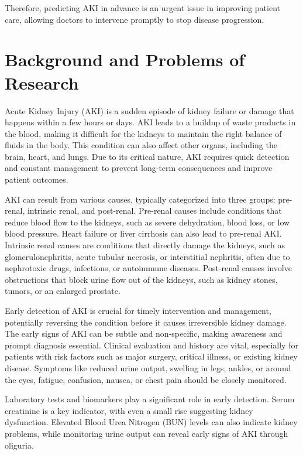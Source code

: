 \documentclass[../main.tex]{subfiles}
\begin{document}
Therefore, predicting AKI in advance is an urgent issue in improving patient care, allowing doctors to intervene promptly to stop disease progression.



\section{Background and Problems of Research} 
\label{sec:giaiphap}

Acute Kidney Injury (AKI) is a sudden episode of kidney failure or damage that happens within a few hours or days. 
AKI leads to a buildup of waste products in the blood, making it difficult for the kidneys to maintain the right balance of fluids in the body. 
This condition can also affect other organs, including the brain, heart, and lungs. Due to its critical nature, AKI requires quick detection and constant management to prevent long-term consequences and improve patient outcomes.

AKI can result from various causes, typically categorized into three groups: pre-renal, intrinsic renal, and post-renal. 
Pre-renal causes include conditions that reduce blood flow to the kidneys, such as severe dehydration, blood loss, or low blood pressure. 
Heart failure or liver cirrhosis can also lead to pre-renal AKI.
Intrinsic renal causes are conditions that directly damage the kidneys, such as glomerulonephritis, acute tubular necrosis, or interstitial nephritis, often due to nephrotoxic drugs, infections, or autoimmune diseases. %
Post-renal causes involve obstructions that block urine flow out of the kidneys, such as kidney stones, tumors, or an enlarged prostate.
 
Early detection of AKI is crucial for timely intervention and management, potentially reversing the condition before it causes irreversible kidney damage. 
The early signs of AKI can be subtle and non-specific, making awareness and prompt diagnosis essential. 
Clinical evaluation and history are vital, especially for patients with risk factors such as major surgery, critical illness, or existing kidney disease. 
Symptoms like reduced urine output, swelling in legs, ankles, or around the eyes, fatigue, confusion, nausea, or chest pain should be closely monitored.

Laboratory tests and biomarkers play a significant role in early detection. 
Serum creatinine is a key indicator, with even a small rise suggesting kidney dysfunction. 
Elevated Blood Urea Nitrogen (BUN) levels can also indicate kidney problems, while monitoring urine output can reveal early signs of AKI through oliguria. 
\end{document}
